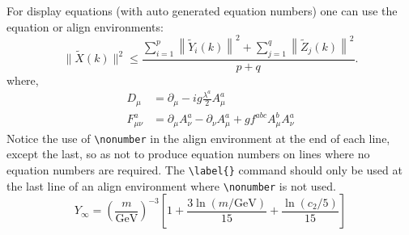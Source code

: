 For display equations (with auto generated equation numbers)
one can use the equation or align environments:
\begin{equation}
	\|\tilde{X}(k)\|^2 \leq\frac{\sum\limits_{i=1}^{p}\left\|\tilde{Y}_i(k)\right\|^2+\sum\limits_{j=1}^{q}\left\|\tilde{Z}_j(k)\right\|^2 }{p+q}.\label{eq1}
\end{equation}
where,
\begin{align}
	D_\mu &=  \partial_\mu - ig \frac{\lambda^a}{2} A^a_\mu \nonumber \\
	F^a_{\mu\nu} &= \partial_\mu A^a_\nu - \partial_\nu A^a_\mu + g f^{abc} A^b_\mu A^a_\nu \label{eq2}
\end{align}
Notice the use of \verb+\nonumber+ in the align environment at the end
of each line, except the last, so as not to produce equation numbers on
lines where no equation numbers are required. The \verb+\label{}+ command
should only be used at the last line of an align environment where
\verb+\nonumber+ is not used.
\begin{equation}
	Y_\infty = \left( \frac{m}{\textrm{GeV}} \right)^{-3}
	\left[ 1 + \frac{3 \ln(m/\textrm{GeV})}{15}
	+ \frac{\ln(c_2/5)}{15} \right]
\end{equation}

